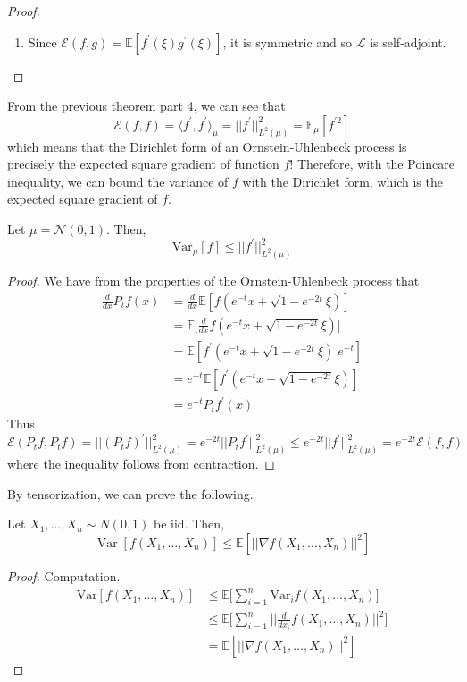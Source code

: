 \documentclass{article}
\DeclareMathOperator{\Var}{Var}
\begin{document}
\begin{proof}
\begin{enumerate}
    \item Since $\mathcal{E}(f, g) = \mathbb{E}[f^\prime(\xi) g^\prime (\xi)]$, it is symmetric and so $\mathscr{L}$ is self-adjoint. 
\end{enumerate}

\end{proof}

From the previous theorem part 4, we can see that 
\[\mathcal{E}(f, f) = \langle f^\prime, f^\prime \rangle_\mu = ||f^\prime||_{L^2(\mu)}^2 = \mathbb{E}_\mu[ f^{\prime 2} ]\]
which means that the Dirichlet form of an Ornstein-Uhlenbeck process is precisely the expected square gradient of function $f$! Therefore, with the Poincare inequality, we can bound the variance of $f$ with the Dirichlet form, which is the expected square gradient of $f$. 

\begin{theorem}
Let $\mu = \mathcal{N}(0, 1)$. Then, 
\[\mathrm{Var}_\mu [f] \leq ||f^\prime||_{L^2(\mu)}^2\]
\end{theorem}
\begin{proof}
We have from the properties of the Ornstein-Uhlenbeck process that
\begin{align*}
    \frac{d}{dx} P_t f(x) & = \frac{d}{dx} \mathbb{E}[ f(e^{-t} x + \sqrt{1 - e^{-2t}} \xi)] \\
    & = \mathbb{E} \bigg[ \frac{d}{dx} f(e^{-t} x + \sqrt{1 - e^{-2t}} \xi)] \\
    & = \mathbb{E}[f^\prime (e^{-t} x + \sqrt{1 - e^{-2t}} \xi) \; e^{-t}] \\
    & = e^{-t} \mathbb{E}[f^\prime (e^{-t} x + \sqrt{1 - e^{-2t}} \xi)] \\
    & = e^{-t} P_t f^\prime (x) 
\end{align*}
Thus
\[\mathcal{E}(P_t f, P_t f) = ||(P_t f)^\prime||_{L^2 (\mu)}^2 = e^{-2t} || P_t f^\prime ||^2_{L^2(\mu)} \leq e^{-2t} ||f^\prime||^2_{L^2(\mu)} = e^{-2t} \mathcal{E}(f, f) \]
where the inequality follows from contraction. 
\end{proof}

By tensorization, we can prove the following. 

\begin{corollary}
Let $X_1, \ldots, X_n \sim N(0, 1)$ be iid. Then, 
\[\Var[ f(X_1, \ldots, X_n)] \leq \mathbb{E}[ || \nabla f (X_1, \ldots, X_n)||^2 ]\]
\end{corollary}
\begin{proof}
Computation. 
\begin{align*}
    \mathrm{Var}[f(X_1, \ldots, X_n)] & \leq \mathbb{E} \bigg[ \sum_{i=1}^n \mathrm{Var}_i f(X_1, \ldots, X_n) \bigg] \\
    & \leq \mathbb{E} \bigg[ \sum_{i=1}^n \bigg| \bigg| \frac{d}{dx_i} f(X_1, \ldots, X_n)\bigg|\bigg|^2 \bigg] \\
    & = \mathbb{E}[ ||\nabla f (X_1, \ldots, X_n) ||^2 ]
\end{align*}
\end{proof}
\end{document}
